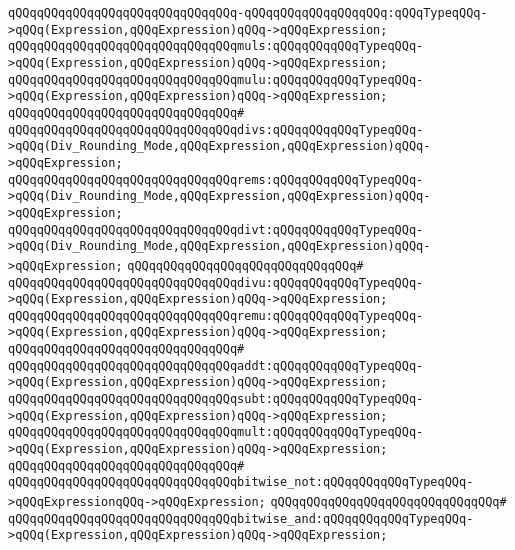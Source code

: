 \verb|qQQqqQQqqQQqqQQqqQQqqQQqqQQqqQQq-qQQqqQQqqQQqqQQqqQQq:qQQqTypeqQQq->qQQq(Expression,qQQqExpression)qQQq->qQQqExpression;|\newline
\verb|qQQqqQQqqQQqqQQqqQQqqQQqqQQqqQQqmuls:qQQqqQQqqQQqTypeqQQq->qQQq(Expression,qQQqExpression)qQQq->qQQqExpression;|\newline
\verb|qQQqqQQqqQQqqQQqqQQqqQQqqQQqqQQqmulu:qQQqqQQqqQQqTypeqQQq->qQQq(Expression,qQQqExpression)qQQq->qQQqExpression;|\newline
\verb|qQQqqQQqqQQqqQQqqQQqqQQqqQQqqQQq#|\newline
\verb|qQQqqQQqqQQqqQQqqQQqqQQqqQQqqQQqdivs:qQQqqQQqqQQqTypeqQQq->qQQq(Div_Rounding_Mode,qQQqExpression,qQQqExpression)qQQq->qQQqExpression;|\newline
\verb|qQQqqQQqqQQqqQQqqQQqqQQqqQQqqQQqrems:qQQqqQQqqQQqTypeqQQq->qQQq(Div_Rounding_Mode,qQQqExpression,qQQqExpression)qQQq->qQQqExpression;|\newline
\verb|qQQqqQQqqQQqqQQqqQQqqQQqqQQqqQQqdivt:qQQqqQQqqQQqTypeqQQq->qQQq(Div_Rounding_Mode,qQQqExpression,qQQqExpression)qQQq->qQQqExpression;|\newline
\verb|qQQqqQQqqQQqqQQqqQQqqQQqqQQqqQQq#|\newline
\verb|qQQqqQQqqQQqqQQqqQQqqQQqqQQqqQQqdivu:qQQqqQQqqQQqTypeqQQq->qQQq(Expression,qQQqExpression)qQQq->qQQqExpression;|\newline
\verb|qQQqqQQqqQQqqQQqqQQqqQQqqQQqqQQqremu:qQQqqQQqqQQqTypeqQQq->qQQq(Expression,qQQqExpression)qQQq->qQQqExpression;|\newline
\verb|qQQqqQQqqQQqqQQqqQQqqQQqqQQqqQQq#|\newline
\verb|qQQqqQQqqQQqqQQqqQQqqQQqqQQqqQQqaddt:qQQqqQQqqQQqTypeqQQq->qQQq(Expression,qQQqExpression)qQQq->qQQqExpression;|\newline
\verb|qQQqqQQqqQQqqQQqqQQqqQQqqQQqqQQqsubt:qQQqqQQqqQQqTypeqQQq->qQQq(Expression,qQQqExpression)qQQq->qQQqExpression;|\newline
\verb|qQQqqQQqqQQqqQQqqQQqqQQqqQQqqQQqmult:qQQqqQQqqQQqTypeqQQq->qQQq(Expression,qQQqExpression)qQQq->qQQqExpression;|\newline
\verb|qQQqqQQqqQQqqQQqqQQqqQQqqQQqqQQq#|\newline
\verb|qQQqqQQqqQQqqQQqqQQqqQQqqQQqqQQqbitwise_not:qQQqqQQqqQQqTypeqQQq->qQQqExpressionqQQq->qQQqExpression;|\newline
\verb|qQQqqQQqqQQqqQQqqQQqqQQqqQQqqQQq#|\newline
\verb|qQQqqQQqqQQqqQQqqQQqqQQqqQQqqQQqbitwise_and:qQQqqQQqqQQqTypeqQQq->qQQq(Expression,qQQqExpression)qQQq->qQQqExpression;|\newline
